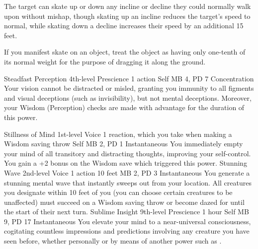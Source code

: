 The target can skate up or down any incline or decline they
could normally walk upon without mishap, though skating up
an incline reduces the target's speed to normal, while skating
down a decline increases their speed by an additional 15 feet.

If you manifest skate on an object, treat the object as having
only one-tenth of its normal weight for the purpose of dragging
it along the ground.

\DndPowerHeader%
    {Steadfast Perception\label{pwr:steadfast_perception}}
    {4th-level Prescience}
    {1 action}
    {Self}
    {MB 4, PD 7}
    {Concentration}
Your vision cannot be distracted or misled,
granting you immunity to all figments and visual deceptions
(such as invisibility), but not mental deceptions. Moreover,
your Wisdom (Perception) checks are made with advantage for
the duration of this power.

\DndPowerHeader%
    {Stillness of Mind\label{pwr:stillness_of_mind}}
    {1st-level Voice}
    {1 reaction, which you take when making a Wisdom saving throw}
    {Self}
    {MB 2, PD 1}
    {Instantaneous}
You immediately empty your mind of all transitory
and distracting thoughts, improving your self-control. You
gain a +2 bonus on the Wisdom save which triggered this power.
\DndPowerHeader%
    {Stunning Wave\label{pwr:stunning_wave}}
    {2nd-level Voice}
    {1 action}
    {10 feet}
    {MB 2, PD 3}
    {Instantaneous}
You generate a stunning mental wave that
instantly sweeps out from your location. All creatures you
designate within 10 feet of you (you can choose certain creatures
to be unaffected) must succeed on a Wisdom saving throw or
become dazed for until the start of their next turn.
\DndPowerHeader%
    {Sublime Insight\label{pwr:sublime_insight}}
    {9th-level Prescience}
    {1 hour}
    {Self}
    {MB 9, PD 17}
    {Instantaneous}
You elevate your mind to a
near-universal consciousness,
cogitating countless impressions and predictions
involving any creature you have seen before,
whether personally or by means of another power
such as .

